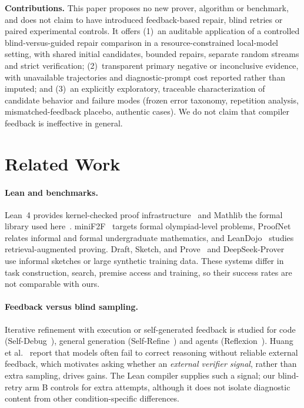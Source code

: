 \documentclass[runningheads,a4paper]{llncs}
\begin{document}
\smallskip\noindent\textbf{Contributions.} This paper proposes no new prover, algorithm or benchmark, and does not claim to have introduced feedback-based repair, blind retries or paired experimental controls. It offers (1)~an auditable application of a controlled blind-versus-guided repair comparison in a resource-constrained local-model setting, with shared initial candidates, bounded repairs, separate random streams and strict verification;
(2)~transparent primary negative or inconclusive evidence, with unavailable
trajectories and diagnostic-prompt cost reported rather than imputed; and
(3)~an explicitly exploratory, traceable characterization of candidate behavior and
failure modes (frozen error taxonomy, repetition analysis, mismatched-feedback
placebo, authentic cases). We do not claim that compiler feedback is ineffective in general.

\section{Related Work}
\paragraph{Lean and benchmarks.} Lean~4 provides kernel-checked proof
infrastructure~\cite{demoura2021lean4} and Mathlib the formal library used
here~\cite{mathlib2020}. miniF2F~\cite{zheng2022minif2f} targets formal
olympiad-level problems, ProofNet~\cite{azerbayev2023proofnet} relates informal
and formal undergraduate mathematics, and LeanDojo~\cite{yang2023leandojo}
studies retrieval-augmented proving. Draft, Sketch, and
Prove~\cite{jiang2023dsp} and DeepSeek-Prover~\cite{xin2024deepseekprover} use
informal sketches or large synthetic training data. These systems differ in task
construction, search, premise access and training, so their success rates are not
comparable with ours.

\paragraph{Feedback versus blind sampling.} Iterative refinement with execution or
self-generated feedback is studied for code
(Self-Debug~\cite{chen2024selfdebug}), general generation
(Self-Refine~\cite{madaan2023selfrefine}) and agents
(Reflexion~\cite{shinn2023reflexion}). Huang et al.~\cite{huang2024selfcorrect}
report that models often fail to correct reasoning without reliable external
feedback, which motivates asking whether an \emph{external verifier signal},
rather than extra sampling, drives gains. The Lean compiler supplies such a signal;
our blind-retry arm B controls for extra attempts, although it does not isolate diagnostic content from other condition-specific differences.
\end{document}
